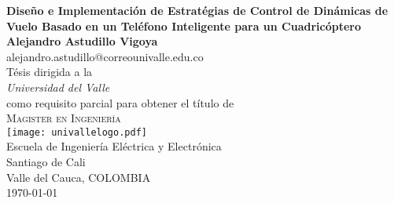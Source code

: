 \begin{titlepage}
\begin{center}
 {\huge\bfseries Diseño e Implementación de Estratégias de Control de Dinámicas de Vuelo Basado en un Teléfono Inteligente para un Cuadricóptero\\}
 \vspace{1.5cm}
 {\Large\bfseries Alejandro Astudillo Vigoya}\\[5pt]
 alejandro.astudillo@correounivalle.edu.co\\[14pt]
 \vspace{1.5cm}
{Tésis dirigida a la} \\[5pt]
\emph{{Universidad del Valle}}\\[1.5cm]
{como requisito parcial para obtener el título de} \\[2cm]
\textsc{\Large{{Magister en Ingeniería}}} \\[5pt]
 \vfill
 \vspace{0.5cm}
\texttt{[image: univallelogo.pdf]}\\[5pt]
{Escuela de Ingeniería Eléctrica y Electrónica}\\[5pt]
{Santiago de Cali}\\[5pt]
{Valle del Cauca,
 COLOMBIA}\\
 \vfill
 \vspace{0.2cm}
{\today} %
\end{center}
\end{titlepage}
